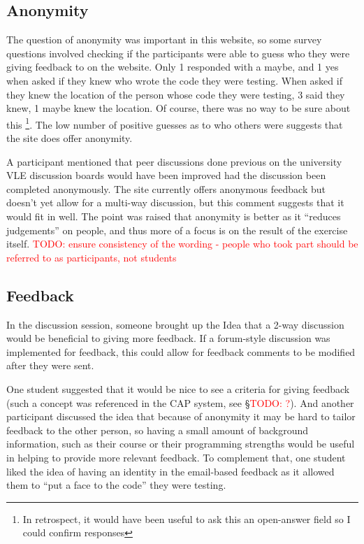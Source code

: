 \documentclass[a4paper,11pt]{report}
\newcommand{\todo}[1]{\textcolor{red}{TODO: #1}}
\begin{document}
\subsection{Anonymity}
The question of anonymity was important in this website, so some survey questions involved checking if the participants were able to guess who they were giving feedback to on the website. Only 1 responded with a maybe, and 1 yes when asked if they knew who wrote the code they were testing. When asked if they knew the location of the person whose code they were testing, 3 said they knew, 1 maybe knew the location. Of course, there was no way to be sure about this \footnote{In retrospect, it would have been useful to ask this an open-answer field so I could confirm responses}. The low number of positive guesses as to who others were suggests that the site does offer anonymity.\par
A participant mentioned that peer discussions done previous on the university VLE discussion boards would have been improved had the discussion been completed anonymously. The site currently offers anonymous feedback but doesn't yet allow for a multi-way discussion, but this comment suggests that it would fit in well. The point was raised that anonymity is better as it ``reduces judgements'' on people, and thus more of a focus is on the result of the exercise itself.
\todo{ensure consistency of the wording - people who took part should be referred to as participants, not students}
\subsection{Feedback}
In the discussion session, someone brought up the Idea that a 2-way discussion would be beneficial to giving more feedback. If a forum-style discussion was implemented for feedback, this could allow for feedback comments to be modified after they were sent.\par
One student suggested that it would be nice to see a criteria for giving feedback (such a concept was referenced in the CAP system, see \S \todo{?}). And another participant discussed the idea that because of anonymity it may be hard to tailor feedback to the other person, so having a small amount of background information, such as their course or their programming strengths would be useful in helping to provide more relevant feedback. To complement that, one student liked the idea of having an identity in the email-based feedback as it allowed them to ``put a face to the code'' they were testing.
\end{document}
